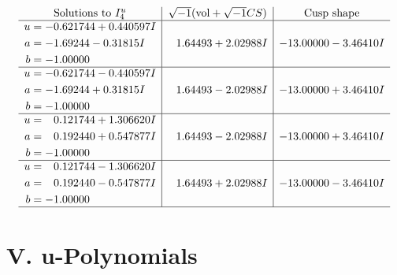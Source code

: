 \documentclass[1p]{elsarticle_modified}
\theoremstyle{definition}
\newcommand{\I}{\sqrt{-1}}
\begin{document}
$$\begin{array}{c|c|c}  
\text{Solutions to }I^u_{4}& \I (\text{vol} + \sqrt{-1}CS) & \text{Cusp shape}\\
 \hline 
\begin{aligned}
u &= -0.621744 + 0.440597 I \\
a &= -1.69244 - 0.31815 I \\
b &= -1.00000\phantom{ +0.000000I}\end{aligned}
 & \phantom{-}1.64493 + 2.02988 I & -13.00000 - 3.46410 I \\ \hline\begin{aligned}
u &= -0.621744 - 0.440597 I \\
a &= -1.69244 + 0.31815 I \\
b &= -1.00000\phantom{ +0.000000I}\end{aligned}
 & \phantom{-}1.64493 - 2.02988 I & -13.00000 + 3.46410 I \\ \hline\begin{aligned}
u &= \phantom{-}0.121744 + 1.306620 I \\
a &= \phantom{-}0.192440 + 0.547877 I \\
b &= -1.00000\phantom{ +0.000000I}\end{aligned}
 & \phantom{-}1.64493 - 2.02988 I & -13.00000 + 3.46410 I \\ \hline\begin{aligned}
u &= \phantom{-}0.121744 - 1.306620 I \\
a &= \phantom{-}0.192440 - 0.547877 I \\
b &= -1.00000\phantom{ +0.000000I}\end{aligned}
 & \phantom{-}1.64493 + 2.02988 I & -13.00000 - 3.46410 I\\
 \hline 
 \end{array}$$\newpage
\newpage\renewcommand{\arraystretch}{1}
\centering \section*{ V. u-Polynomials}
\end{document}

